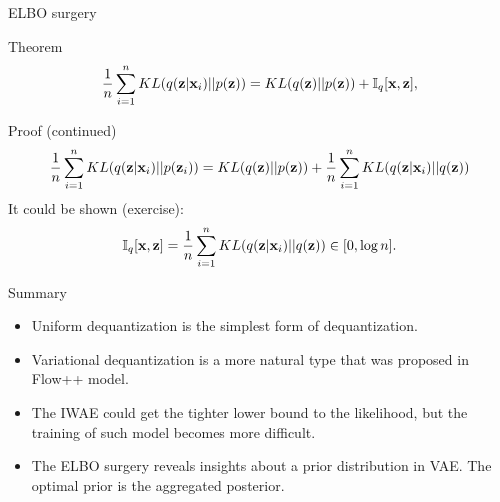 \begin{frame}{ELBO surgery}
	\begin{block}{Theorem}
			\[
			    \frac{1}{n} \sum_{i=1}^n KL(q(\mathbf{z} | \mathbf{x}_i) || p(\mathbf{z})) = KL(q(\mathbf{z}) || p(\mathbf{z})) + \mathbb{I}_{q} [\mathbf{x}, \mathbf{z}],
			\]
	\end{block}
	\begin{block}{Proof (continued)}
	\vspace{-0.5cm}
		\[
		    \frac{1}{n} \sum_{i=1}^n KL(q(\mathbf{z} | \mathbf{x}_i) || p(\mathbf{z}_i)) = KL (q(\mathbf{z}) || p(\mathbf{z})) + \frac{1}{n}\sum_{i=1}^n KL(q(\mathbf{z} | \mathbf{x}_i) || q (\mathbf{z}))
		\]
		It could be shown (exercise):
		\[
			\mathbb{I}_{q} [\mathbf{x}, \mathbf{z}] = \frac{1}{n}\sum_{i=1}^n KL(q(\mathbf{z} | \mathbf{x}_i) || q (\mathbf{z})) \in [0, \log n].
		\]
	\end{block}

\end{frame}
\begin{frame}{Summary}
	\begin{itemize}
		\item Uniform dequantization is the simplest form of dequantization. 
		\vfill
		\item Variational dequantization is a more natural type that was proposed in Flow++ model.
		\vfill
		\item The IWAE could get the tighter lower bound to the likelihood, but the training of such model becomes more difficult.
		\vfill
		\item The ELBO surgery reveals insights about a prior distribution in VAE. The optimal prior is the aggregated posterior.
	\end{itemize}
\end{frame}

 